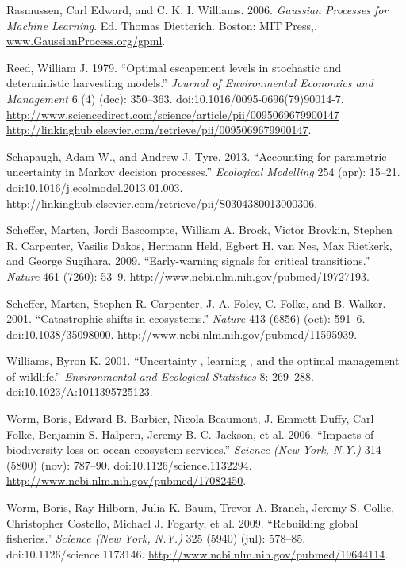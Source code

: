\documentclass[author-year, review]{elsarticle} %
\begin{document}
Rasmussen, Carl Edward, and C. K. I. Williams. 2006. \emph{Gaussian
Processes for Machine Learning}. Ed. Thomas Dietterich. Boston: MIT
Press,. \url{www.GaussianProcess.org/gpml}.

Reed, William J. 1979. ``Optimal escapement levels in stochastic and
deterministic harvesting models.'' \emph{Journal of Environmental
Economics and Management} 6 (4) (dec): 350--363.
doi:10.1016/0095-0696(79)90014-7.
\href{http://www.sciencedirect.com/science/article/pii/0095069679900147 http://linkinghub.elsevier.com/retrieve/pii/0095069679900147}{http://www.sciencedirect.com/science/article/pii/0095069679900147
http://linkinghub.elsevier.com/retrieve/pii/0095069679900147}.

Schapaugh, Adam W., and Andrew J. Tyre. 2013. ``Accounting for
parametric uncertainty in Markov decision processes.'' \emph{Ecological
Modelling} 254 (apr): 15--21. doi:10.1016/j.ecolmodel.2013.01.003.
\url{http://linkinghub.elsevier.com/retrieve/pii/S0304380013000306}.

Scheffer, Marten, Jordi Bascompte, William A. Brock, Victor Brovkin,
Stephen R. Carpenter, Vasilis Dakos, Hermann Held, Egbert H. van Nes,
Max Rietkerk, and George Sugihara. 2009. ``Early-warning signals for
critical transitions.'' \emph{Nature} 461 (7260): 53--9.
\url{http://www.ncbi.nlm.nih.gov/pubmed/19727193}.

Scheffer, Marten, Stephen R. Carpenter, J. A. Foley, C. Folke, and B.
Walker. 2001. ``Catastrophic shifts in ecosystems.'' \emph{Nature} 413
(6856) (oct): 591--6. doi:10.1038/35098000.
\url{http://www.ncbi.nlm.nih.gov/pubmed/11595939}.

Williams, Byron K. 2001. ``Uncertainty , learning , and the optimal
management of wildlife.'' \emph{Environmental and Ecological Statistics}
8: 269--288. doi:10.1023/A:1011395725123.

Worm, Boris, Edward B. Barbier, Nicola Beaumont, J. Emmett Duffy, Carl
Folke, Benjamin S. Halpern, Jeremy B. C. Jackson, et al. 2006. ``Impacts
of biodiversity loss on ocean ecosystem services.'' \emph{Science (New
York, N.Y.)} 314 (5800) (nov): 787--90. doi:10.1126/science.1132294.
\url{http://www.ncbi.nlm.nih.gov/pubmed/17082450}.

Worm, Boris, Ray Hilborn, Julia K. Baum, Trevor A. Branch, Jeremy S.
Collie, Christopher Costello, Michael J. Fogarty, et al. 2009.
``Rebuilding global fisheries.'' \emph{Science (New York, N.Y.)} 325
(5940) (jul): 578--85. doi:10.1126/science.1173146.
\url{http://www.ncbi.nlm.nih.gov/pubmed/19644114}.
\end{document}

